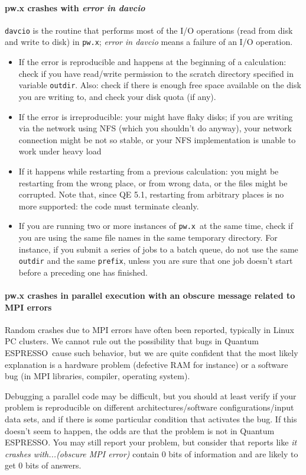 \documentclass[12pt,a4paper]{article}
\def\qe{{\sc Quantum ESPRESSO}}
\def\pwx{\texttt{pw.x}}
\begin{document}
\paragraph{pw.x crashes with {\em error in davcio}}
\texttt{davcio} is the routine that performs most of the I/O operations (read
from disk and write to disk) in \pwx; {\em error in davcio} means a
failure of an I/O operation. 
\begin{itemize}
\item If the error is reproducible and happens at the beginning of a
  calculation: check if you have read/write permission to the scratch
  directory specified in variable \texttt{outdir}. Also: check if there is
  enough free space available on the disk you are writing to, and
  check your disk quota (if any).
\item If the error is irreproducible: your might have flaky disks; if
  you are writing via the network using NFS (which you shouldn't do
  anyway), your network connection might be not so stable, or your 
  NFS implementation is unable to work under heavy load 
\item If it happens while restarting from a previous calculation: you
  might be restarting from the wrong place, or from wrong  data, or
  the files might be corrupted. Note that, since QE 5.1, restarting from
  arbitrary places is no more supported: the code must terminate cleanly.
\item If you are running two or more instances of \pwx\ at
  the same time, check if you are using the same file names in the 
  same temporary directory. For instance, if you submit a series of
  jobs to a batch queue, do not use the same \texttt{outdir} and
  the same \texttt{prefix}, unless you are sure that one job doesn't
  start before a preceding one has finished.
\end{itemize}

\paragraph{pw.x crashes in parallel execution with an obscure message
  related to MPI errors} 
Random crashes due to MPI errors have often been reported, typically
in Linux PC clusters. We cannot rule out the possibility that bugs in
\qe\ cause such behavior, but we are quite confident that
the most likely explanation is a hardware problem (defective RAM  
for instance) or a software bug (in MPI libraries, compiler, operating
system). 

Debugging a parallel code may be difficult, but you should at least
verify if your problem is reproducible on different
architectures/software configurations/input data sets, and if  
there is some particular condition that activates the bug. If this
doesn't seem to happen, the odds are that the problem is not in
\qe. You may still report your problem, 
but consider that reports like {\em it crashes with...(obscure MPI error)}
contain 0 bits of information and are likely to get 0 bits of answers.
\end{document}
